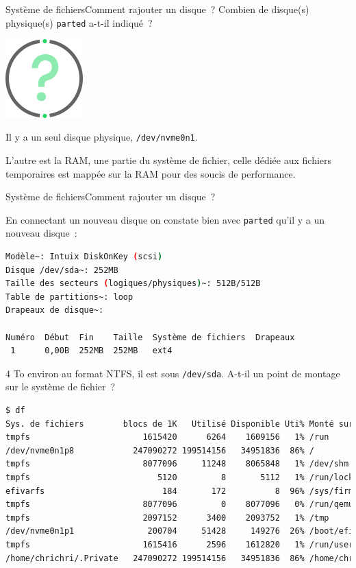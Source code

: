 \documentclass{beamer}
\begin{document}
    \begin{frame}{Système de fichiers}{Comment rajouter un disque~?}
        Combien de disque(s) physique(s) \lstinline{parted} a-t-il indiqué~?
        \begin{center}
            \includegraphics[width=3cm]{image/question-mark}
        \end{center}
        \pause
        \begin{dangercolorbox}
            Il y a un seul disque physique, \lstinline{/dev/nvme0n1}.

            L'autre est la RAM, une partie du système de fichier, celle dédiée aux fichiers temporaires est mappée sur la RAM pour des soucis de performance.
        \end{dangercolorbox}
    \end{frame}

    \begin{frame}[fragile]{Système de fichiers}{Comment rajouter un disque~?}
        \begin{scriptsize}
            En connectant un nouveau disque on constate bien avec \lstinline{parted} qu'il y a un nouveau disque~:
            \begin{lstlisting}[language=bash,basicstyle=\tiny\ttfamily]
Modèle~: Intuix DiskOnKey (scsi)
Disque /dev/sda~: 252MB
Taille des secteurs (logiques/physiques)~: 512B/512B
Table de partitions~: loop
Drapeaux de disque~:

Numéro  Début  Fin    Taille  Système de fichiers  Drapeaux
 1      0,00B  252MB  252MB   ext4
            \end{lstlisting}
            4 To environ au format NTFS, il est sous \lstinline{/dev/sda}.
            A-t-il un point de montage sur le système de fichier~?
            \begin{lstlisting}[language=bash,basicstyle=\tiny\ttfamily]
$ df
Sys. de fichiers        blocs de 1K   Utilisé Disponible Uti% Monté sur
tmpfs                       1615420      6264    1609156   1% /run
/dev/nvme0n1p8            247090272 199514156   34951836  86% /
tmpfs                       8077096     11248    8065848   1% /dev/shm
tmpfs                          5120         8       5112   1% /run/lock
efivarfs                        184       172          8  96% /sys/firmware/efi/efivars
tmpfs                       8077096         0    8077096   0% /run/qemu
tmpfs                       2097152      3400    2093752   1% /tmp
/dev/nvme0n1p1               200704     51428     149276  26% /boot/efi
tmpfs                       1615416      2596    1612820   1% /run/user/1000
/home/chrichri/.Private   247090272 199514156   34951836  86% /home/chrichri/Private
            \end{lstlisting}
        \end{scriptsize}
    \end{frame}
\end{document}
